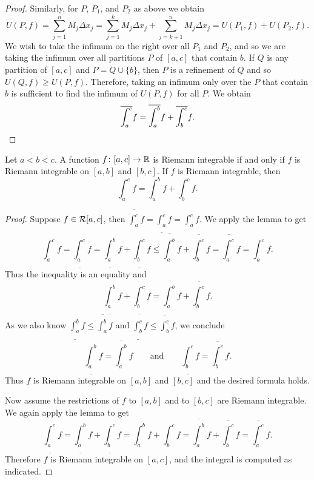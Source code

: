 \begin{proof}
Similarly, for $P$, $P_1$, and $P_2$ as above we obtain
\begin{equation*}
U(P,f) =
\sum_{j=1}^n M_j \Delta x_j
=
\sum_{j=1}^k M_j \Delta x_j
+
\sum_{j=k+1}^n M_j \Delta x_j
=
U(P_1,f) + U(P_2,f) .
\end{equation*}
We wish to take the infimum on the right
over all $P_1$ and $P_2$, and so we are taking the infimum
over all partitions $P$ of $[a,c]$ that contain $b$.  If $Q$ is any partition
of $[a,c]$ and $P = Q \cup \{ b \}$, then $P$ is a refinement of $Q$
and so $U(Q,f) \geq U(P,f)$.  Therefore, taking an infimum only over the $P$
that contain $b$ is sufficient to find the infimum of $U(P,f)$ for
all $P$.
We obtain
\begin{equation*}
\overline{\int_a^c} f
=
\overline{\int_a^b} f + \overline{\int_b^c} f .  \qedhere
\end{equation*}
\end{proof}

\begin{prop}
Let $a < b < c$.  A function $f \colon [a,c] \to {\mathbb{R}}$ is Riemann integrable
if and only if $f$ is Riemann integrable on $[a,b]$ and $[b,c]$.  If
$f$ is Riemann integrable, then
\begin{equation*}
\int_a^c f
=
\int_a^b f
+
\int_b^c f .
\end{equation*}
\end{prop}

\begin{proof}
Suppose $f \in {\mathcal{R}}[a,c]$, then 
$\overline{\int_a^c} f = 
\underline{\int_a^c} f = 
\int_a^c f$.  We apply the lemma to get
\begin{equation*}
\int_a^c f
=
\underline{\int_a^c} f
 =
\underline{\int_a^b} f + \underline{\int_b^c} f
 \leq
\overline{\int_a^b} f + \overline{\int_b^c} f
 =
\overline{\int_a^c} f
 =
\int_a^c f .
\end{equation*}
Thus the inequality is an equality and
\begin{equation*}
\underline{\int_a^b} f + \underline{\int_b^c} f
=
\overline{\int_a^b} f + \overline{\int_b^c} f .
\end{equation*}
As we also know 
$\underline{\int_a^b} f \leq \overline{\int_a^b} f$
and
$\underline{\int_b^c} f \leq \overline{\int_b^c} f$, we 
conclude 
\begin{equation*}
\underline{\int_a^b} f
=
\overline{\int_a^b} f
\qquad \text{and} \qquad
\underline{\int_b^c} f
=
\overline{\int_b^c} f .
\end{equation*}
Thus $f$ is Riemann integrable on $[a,b]$ and $[b,c]$ and the desired formula
holds.

Now assume the restrictions of $f$ to $[a,b]$ and to $[b,c]$
are Riemann integrable.  We again apply the lemma to get
\begin{equation*}
\underline{\int_a^c} f
=
\underline{\int_a^b} f + \underline{\int_b^c} f
=
\int_a^b f + \int_b^c f
=
\overline{\int_a^b} f + \overline{\int_b^c} f
=
\overline{\int_a^c} f .
\end{equation*}
Therefore $f$ is Riemann integrable on $[a,c]$, and the integral is computed
as indicated.
\end{proof}

